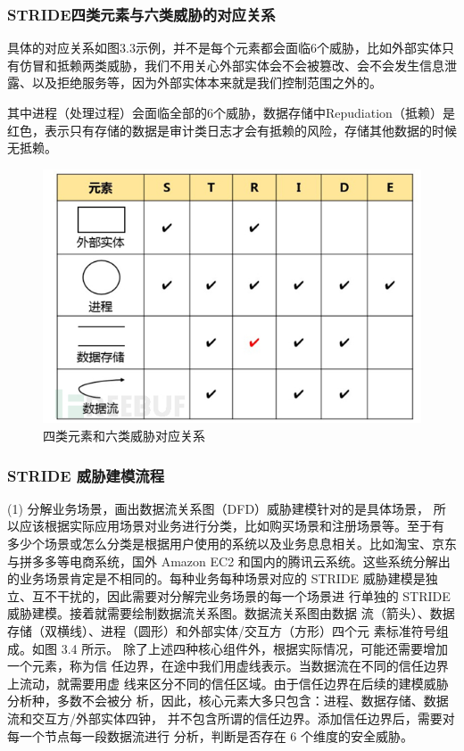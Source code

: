 \subsubsection{STRIDE四类元素与六类威胁的对应关系}

具体的对应关系如图3.3示例，并不是每个元素都会面临6个威胁，比如外部实体只有仿冒和抵赖两类威胁，我们不用关心外部实体会不会被篡改、会不会发生信息泄露、以及拒绝服务等，因为外部实体本来就是我们控制范围之外的。

其中进程（处理过程）会面临全部的6个威胁，数据存储中Repudiation（抵赖）是红色，表示只有存储的数据是审计类日志才会有抵赖的风险，存储其他数据的时候无抵赖。
\begin{figure}
    \centering
    \includegraphics[scale=0.6]{resources/img/i6.png}
    \caption{四类元素和六类威胁对应关系}
  \end{figure}

\subsubsection{STRIDE 威胁建模流程}
(1) 分解业务场景，画出数据流关系图（DFD）威胁建模针对的是具体场景，
所以应该根据实际应用场景对业务进行分类，比如购买场景和注册场景等。至于有
多少个场景或怎么分类是根据用户使用的系统以及业务息息相关。比如淘宝、京东
与拼多多等电商系统，国外 Amazon EC2 和国内的腾讯云系统。这些系统分解出的业务场景肯定是不相同的。每种业务每种场景对应的
STRIDE 威胁建模是独立、互不干扰的，因此需要对分解完业务场景的每一个场景进
行单独的 STRIDE 威胁建模。接着就需要绘制数据流关系图。数据流关系图由数据
流（箭头）、数据存储（双横线）、进程（圆形）和外部实体/交互方（方形）四个元
素标准符号组成。如图 3.4 所示。
除了上述四种核心组件外，根据实际情况，可能还需要增加一个元素，称为信
任边界，在途中我们用虚线表示。当数据流在不同的信任边界上流动，就需要用虚
线来区分不同的信任区域。由于信任边界在后续的建模威胁分析种，多数不会被分
析，因此，核心元素大多只包含：进程、数据存储、数据流和交互方/外部实体四钟，
并不包含所谓的信任边界。添加信任边界后，需要对每一个节点每一段数据流进行
分析，判断是否存在 6 个维度的安全威胁。

